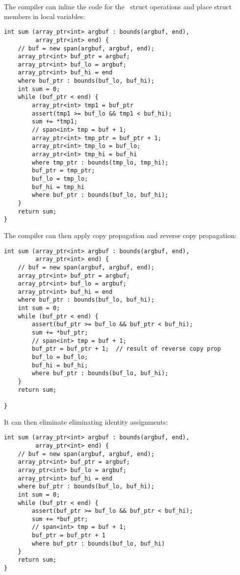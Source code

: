 The compiler can inline the code for the \spanptr\ struct operations
and place struct members in local variables:
\begin{verbatim}
int sum (array_ptr<int> argbuf : bounds(argbuf, end),
         array_ptr<int> end) {
    // buf = new span(argbuf, argbuf, end);
    array_ptr<int> buf_ptr = argbuf; 
    array_ptr<int> buf_lo = argbuf;
    array_ptr<int> buf_hi = end
    where buf_ptr : bounds(buf_lo, buf_hi);
    int sum = 0;
    while (buf_ptr < end) {
        array_ptr<int> tmp1 = buf_ptr
        assert(tmp1 >= buf_lo && tmp1 < buf_hi);
        sum += *tmp1;
        // span<int> tmp = buf + 1;
        array_ptr<int> tmp_ptr = buf_ptr + 1;
        array_ptr<int> tmp_lo = buf_lo;
        array_ptr<int> tmp_hi = buf_hi
        where tmp_ptr : bounds(tmp_lo, tmp_hi);
        buf_ptr = tmp_ptr;
        buf_lo = tmp_lo;
        buf_hi = tmp_hi
        where buf_ptr : bounds(buf_lo, buf_hi);
    }
    return sum;
}
\end{verbatim}

The compiler can then apply copy propagation and reverse copy
propagation:

\begin{verbatim}
int sum (array_ptr<int> argbuf : bounds(argbuf, end), 
         array_ptr<int> end) {
    // buf = new span(argbuf, argbuf, end);
    array_ptr<int> buf_ptr = argbuf; 
    array_ptr<int> buf_lo = argbuf;
    array_ptr<int> buf_hi = end
    where buf_ptr : bounds(buf_lo, buf_hi);
    int sum = 0;
    while (buf_ptr < end) {
        assert(buf_ptr >= buf_lo && buf_ptr < buf_hi);
        sum += *buf_ptr;
        // span<int> tmp = buf + 1;
        buf_ptr = buf_ptr + 1;  // result of reverse copy prop
        buf_lo = buf_lo;
        buf_hi = buf_hi;
        where buf_ptr : bounds(buf_lo, buf_hi);
    }
    return sum;

}
\end{verbatim}

It can then eliminate eliminating identity assignments:

\begin{verbatim}
int sum (array_ptr<int> argbuf : bounds(argbuf, end), 
         array_ptr<int> end) {
    // buf = new span(argbuf, argbuf, end);
    array_ptr<int> buf_ptr = argbuf; 
    array_ptr<int> buf_lo = argbuf;
    array_ptr<int> buf_hi = end
    where buf_ptr : bounds(buf_lo, buf_hi);
    int sum = 0;
    while (buf_ptr < end) {
        assert(buf_ptr >= buf_lo && buf_ptr < buf_hi);
        sum += *buf_ptr;
        // span<int> tmp = buf + 1;
        buf_ptr = buf_ptr + 1
        where buf_ptr : bounds(buf_lo, buf_hi)
    }
    return sum;
}
\end{verbatim}

